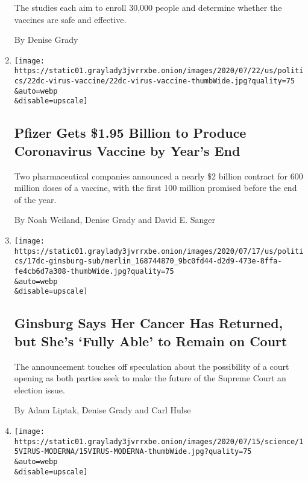 \begin{enumerate}
  The studies each aim to enroll 30,000 people and determine whether the
  vaccines are safe and effective.

  By Denise Grady
\item
  \href{/2020/07/22/us/politics/pfizer-coronavirus-vaccine.html}{}

  \texttt{[image: https://static01.graylady3jvrrxbe.onion/images/2020/07/22/us/politics/22dc-virus-vaccine/22dc-virus-vaccine-thumbWide.jpg?quality=75\\\&auto=webp\\\&disable=upscale]}

  \hypertarget{pfizer-gets-195-billion-to-produce-coronavirus-vaccine-by-years-end}{%
  \subsection{Pfizer Gets \$1.95 Billion to Produce Coronavirus Vaccine
  by Year's
  End}\label{pfizer-gets-195-billion-to-produce-coronavirus-vaccine-by-years-end}}

  Two pharmaceutical companies announced a nearly \$2 billion contract
  for 600 million doses of a vaccine, with the first 100 million
  promised before the end of the year.

  By Noah Weiland, Denise Grady and David E. Sanger
\item
  \href{/2020/07/17/us/justice-ruth-bader-ginsburg-cancer.html}{}

  \texttt{[image: https://static01.graylady3jvrrxbe.onion/images/2020/07/17/us/politics/17dc-ginsburg-sub/merlin\_168744870\_9bc0fd44-d2d9-473e-8ffa-fe4cb6d7a308-thumbWide.jpg?quality=75\\\&auto=webp\\\&disable=upscale]}

  \hypertarget{ginsburg-says-her-cancer-has-returned-but-shes-fully-able-to-remain-on-court}{%
  \subsection{Ginsburg Says Her Cancer Has Returned, but She's `Fully
  Able' to Remain on
  Court}\label{ginsburg-says-her-cancer-has-returned-but-shes-fully-able-to-remain-on-court}}

  The announcement touches off speculation about the possibility of a
  court opening as both parties seek to make the future of the Supreme
  Court an election issue.

  By Adam Liptak, Denise Grady and Carl Hulse
\item
  \href{/2020/07/14/health/cornavirus-vaccine-moderna.html}{}

  \texttt{[image: https://static01.graylady3jvrrxbe.onion/images/2020/07/15/science/15VIRUS-MODERNA/15VIRUS-MODERNA-thumbWide.jpg?quality=75\\\&auto=webp\\\&disable=upscale]}


\end{enumerate}
